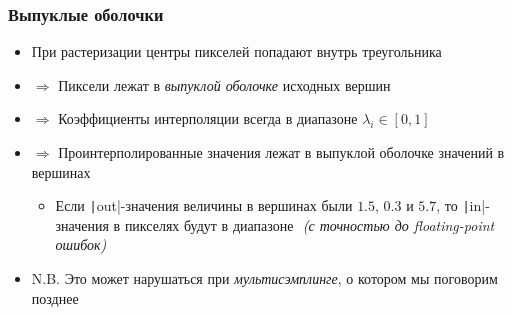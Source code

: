 \documentclass[10pt]{beamer}
\begin{document}
\begin{frame}[fragile]
\frametitle{Выпуклые оболочки}
\begin{itemize}
\item При растеризации центры пикселей попадают внутрь треугольника
\pause
\item \begin{math}\Rightarrow\end{math} Пиксели лежат в \textit{выпуклой оболочке} исходных вершин
\pause
\item \begin{math}\Rightarrow\end{math} Коэффициенты интерполяции всегда в диапазоне \begin{math}\lambda_i \in [0, 1]\end{math}
\pause
\item \begin{math}\Rightarrow\end{math} Проинтерполированные значения лежат в выпуклой оболочке значений в вершинах
\begin{itemize}
\item Если \texttt|out|-значения величины в вершинах были \begin{math}1.5\end{math}, \begin{math}0.3\end{math} и \begin{math}5.7\end{math}, то \texttt|in|-значения в пикселях будут в диапазоне \begin{math}[0.3, 5.7]\end{math} \textit{(с точностью до floating-point ошибок)}
\end{itemize}
\pause
\item N.B. Это может нарушаться при \textit{мультисэмплинге}, о котором мы поговорим позднее
\end{itemize}
\end{frame}
\end{document}
